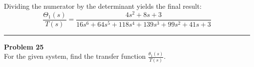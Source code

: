 \documentclass[11pt]{article}
\begin{document}
Dividing the numerator by the determinant yields the final result:
\[
\boxed{\frac{\Theta_1(s)}{T(s)} = \frac{4s^2 + 8s + 3}{16s^6 + 64s^5 + 118s^4 + 139s^3 + 99s^2 + 41s + 3}}
\]

\newpage
  \setcounter{page}{50}  
\noindent\rule{\textwidth}{1pt}
\noindent\textbf{Problem 25} \hfill 
\\ For the given system, find the transfer function $\frac{\theta_1(s)}{T(s)}$.

\begin{figure}[!ht]
\centering
{}
\end{figure}
\end{document}

